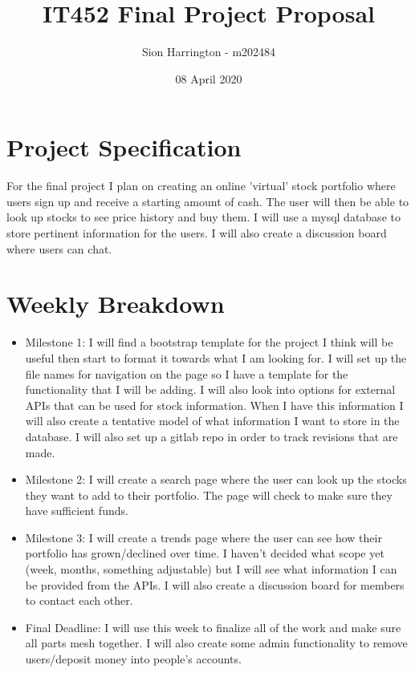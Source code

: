 \documentclass{article}
\title{IT452 Final Project Proposal}
\author{Sion Harrington - m202484 }
\date{ 08 April 2020}
\begin{document}
\maketitle

\section{Project Specification}
    For the final project I plan on creating an online 'virtual' stock portfolio where users sign up and receive a starting amount of cash. The user will then be able to look up stocks to see price history and buy them. I will use a mysql database to store pertinent information for the users.  I will also create a discussion board where users can chat.

\section{Weekly Breakdown}
\begin{itemize}
    \item Milestone 1: I will find a bootstrap template for the project I think will be useful then start to format it towards what I am looking for. I will set up the file names for navigation on the page so I have a template for the functionality that I will be adding. I will also look into options for external APIs that can be used for stock information. When I have this information I will also create a tentative model of what information I want to store in the database. I will also set up a gitlab repo in order to track revisions that are made.
    \item Milestone 2: I will create a search page where the user can look up the stocks they want to add to their portfolio. The page will check to make sure they have sufficient funds. 
    \item Milestone 3: I will create a trends page where the user can see how their portfolio has grown/declined over time. I haven't decided what scope yet (week, months, something adjustable) but I will see what information I can be provided from the APIs. I will also create a discussion board for members to contact each other.
    \item Final Deadline: I will use this week to finalize all of the work and make sure all parts mesh together. I will also create some admin functionality to remove users/deposit money into people's accounts.
\end{itemize}
\end{document}
